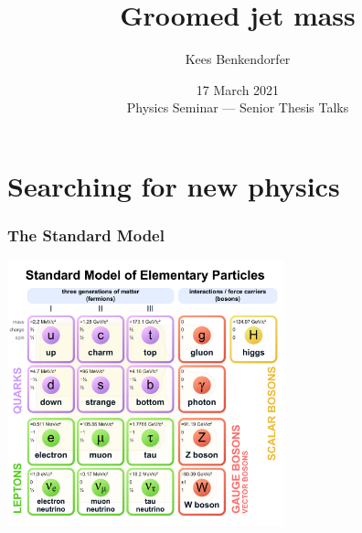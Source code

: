 \documentclass{beamer}
\title{Groomed jet mass}
\author{Kees Benkendorfer}
\institute{Reed College \\ Advisor: Andrew Larkoski}
\date{17 March 2021 \\ Physics Seminar --- Senior Thesis Talks}
\begin{document}
\begin{frame}[noframenumbering]
	\thispagestyle{empty}
	\titlepage
\end{frame}

\section[Outline]{}
\frame{\tableofcontents}


\section{Searching for new physics}
	\begin{frame}
		\frametitle{The Standard Model}
		\begin{center}
			\includegraphics[width=0.6\textwidth]{figures/Standard_Model_of_Elementary_Particles.pdf}
		\end{center}
	\end{frame}
\end{document}
